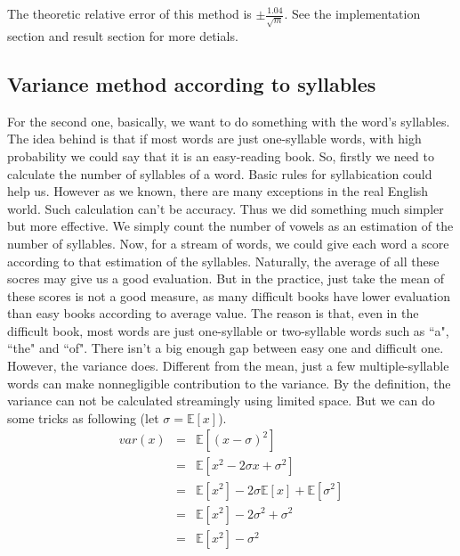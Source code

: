 \documentclass{article}
\begin{document}
		The theoretic relative error of this method is $\pm \frac{1.04}{\sqrt{m}}$. See the implementation section and result section for more detials.

	\subsection{Variance method according to syllables}
		For the second one, basically, we want to do something with the word's syllables. The idea behind is that
		if most words are just one-syllable words, with high probability we could say that it is an easy-reading book.
	\newline
	\newline
		So, firstly we need to calculate the number of syllables of a word. Basic rules for syllabication could help us. However as we known,
		there are many exceptions in the real English world. Such calculation can't be accuracy. Thus we did something much simpler but more
		effective. We simply count the number of vowels as an estimation of the number of syllables.
		Now, for a stream of words, we could give each word a score according to that estimation of the syllables.
	\newline
	\newline
		Naturally, the average of all these socres may give us a good evaluation. But in the practice, just take the mean of these scores is not
		a good measure, as many difficult books have lower evaluation than easy books according to average value.
		The reason is that, even in the difficult book, most
		words are just one-syllable or two-syllable words such as ``a", ``the" and ``of". There isn't a big enough gap between easy one and
		difficult one.
	\newline
	\newline
		However, the variance does. Different from the mean, just a few multiple-syllable words can make nonnegligible contribution to the variance.
	\newline
	\newline
		By the definition, the variance can not be calculated streamingly using limited space. But we can do some tricks as following (let
		$\sigma = \mathbb{E} [x]$).
		\[\begin{array}{lll}
			var(x) & = & \mathbb{E} [(x - \sigma)^2]\\
			& = & \mathbb{E} [x^2 - 2\sigma x + \sigma^2]\\
			& = & \mathbb{E} [x^2] - 2\sigma \mathbb{E} [x] + \mathbb{E} [\sigma^2]\\
			& = & \mathbb{E} [x^2] - 2\sigma^2 + \sigma^2\\
			& = & \mathbb{E} [x^2] - \sigma^2\\
			\end{array}
		\]
\end{document}
